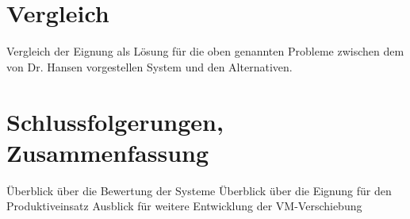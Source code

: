 \documentclass[draft,journal]{IEEEtran}
\begin{document}
\section{Vergleich}
Vergleich der Eignung als Lösung für die oben genannten Probleme
zwischen dem von Dr. Hansen vorgestellen System und den Alternativen.

\section{Schlussfolgerungen, Zusammenfassung}
Überblick über die Bewertung der Systeme
Überblick über die Eignung für den Produktiveinsatz
Ausblick für weitere Entwicklung der VM-Verschiebung


\end{document}
